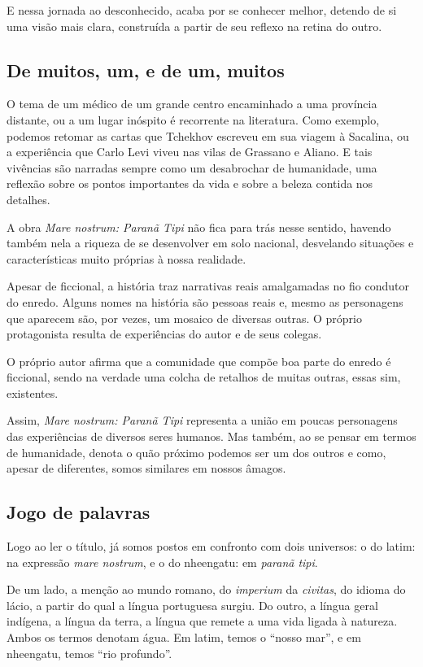 \documentclass[12pt]{extarticle}
\begin{document}
E nessa jornada ao desconhecido, acaba por se conhecer melhor, detendo
de si uma visão mais clara, construída a partir de seu reflexo na retina
do outro.

\subsection{De muitos, um, e de um, muitos}

O tema de um médico de um grande centro encaminhado a uma província
distante, ou a um lugar inóspito é recorrente na literatura. Como
exemplo, podemos retomar as cartas que Tchekhov escreveu em sua viagem à
Sacalina, ou a experiência que Carlo Levi viveu nas vilas de Grassano e
Aliano. E tais vivências são narradas sempre como um desabrochar de
humanidade, uma reflexão sobre os pontos importantes da vida e sobre a
beleza contida nos detalhes.

A obra \emph{Mare nostrum: Paranã Tipi} não fica para trás nesse sentido,
havendo também nela a riqueza de se desenvolver em solo nacional,
desvelando situações e características muito próprias à nossa realidade.

Apesar de ficcional, a história traz narrativas reais amalgamadas no fio
condutor do enredo. Alguns nomes na história são pessoas reais e, mesmo
as personagens que aparecem são, por vezes, um mosaico de diversas
outras. O próprio protagonista resulta de experiências do autor e de
seus colegas.

O próprio autor afirma que a comunidade que compõe boa parte do enredo é
ficcional, sendo na verdade uma colcha de retalhos de muitas outras,
essas sim, existentes.

Assim, \emph{Mare nostrum: Paranã Tipi} representa a união em poucas
personagens das experiências de diversos seres humanos. Mas também, ao
se pensar em termos de humanidade, denota o quão próximo podemos ser um
dos outros e como, apesar de diferentes, somos similares em nossos
âmagos.

\subsection{Jogo de palavras}

Logo ao ler o título, já somos postos em confronto com dois universos: o do
latim: na expressão  \emph{mare nostrum}, e o do nheengatu: em  \emph{paranã tipi}.

De um lado, a menção ao mundo romano, do \emph{imperium} da \emph{civitas}, do idioma do
lácio, a partir do qual a língua portuguesa surgiu.
Do outro, a língua geral indígena, a língua da terra, a língua que remete a
uma vida ligada à natureza. Ambos os termos denotam água. Em latim, temos 
o ``nosso mar'', e em nheengatu, temos ``rio profundo''.
\end{document}

